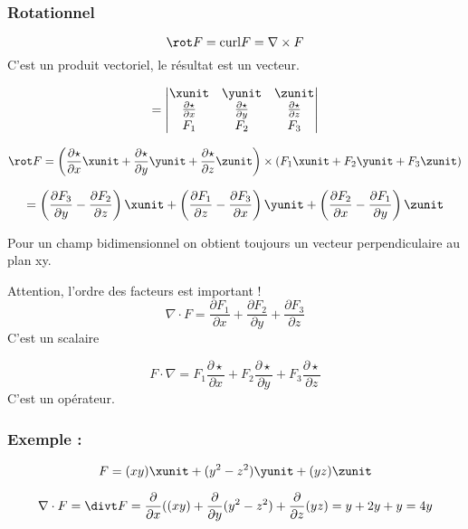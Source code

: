 \subsubsection{Rotationnel}
\begin{mydef}
\[\rot F = \mathrm{curl }F = \nabla \times F\]
C'est un produit vectoriel, le résultat est un vecteur.

\[=
\begin{vmatrix}
\xunit & \yunit & \zunit \\
\frac{\partial \star}{\partial x} & \frac{\partial \star}{\partial y} &\frac{\partial \star}{\partial z} \\
F_1& F_2&F_3 \\
\end{vmatrix}
\]


\[\rot F = \left( \frac{\partial \star}{\partial x} \xunit +\frac{\partial \star}{\partial y} \yunit +\frac{\partial \star}{\partial z} \zunit \right) \times  (F_1 \xunit +F_2 \yunit +F_3 \zunit) \]

\[=\left( \frac{\partial F_3}{\partial y } -  \frac{\partial F_2}{\partial z }\right) \xunit
+\left( \frac{\partial F_1}{\partial z } -  \frac{\partial F_3}{\partial x }\right) \yunit
+\left( \frac{\partial F_2}{\partial x } -  \frac{\partial F_1}{\partial y }\right) \zunit
\]

Pour un champ bidimensionnel on obtient toujours un vecteur perpendiculaire au plan xy.
\end{mydef}




\begin{myrem}

Attention, l'ordre des facteurs est important !
\[\nabla \cdot F = \frac{\partial F_1}{\partial x}+ \frac{\partial F_2 }{\partial y}+ \frac{\partial F_3 }{\partial z}\] C'est un scalaire

\[F\cdot \nabla = F_1  \frac{\partial \star }{\partial x}+F_2 \frac{\partial \star }{\partial y}+ F_3  \frac{\partial \star }{\partial z}\]
C'est un opérateur.

 \end{myrem}

\subsubsection{Exemple :}

\[F=(xy)\xunit+(y^2-z^2)\yunit+(yz)\zunit\]

\[\nabla \cdot F = \divt F = \frac{\partial }{\partial x} ( (xy)+\frac{\partial }{\partial y} (y^2-z^2)+\frac{\partial }{\partial z} (yz) = y+2y+y=4y\]
 
